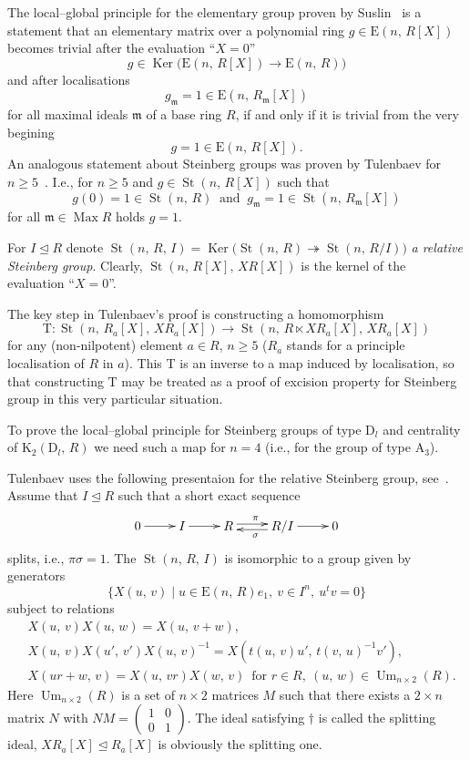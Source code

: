 \documentclass[11pt]{amsart}
\theoremstyle{plain} \declaretheorem[name=Theorem, Refname={Theorem,Theorems}]{tm} \Crefname{tm}{Theorem}{Theorems}
\numberwithin{equation}{section}
\theoremstyle{definition} \newtheorem{df}[lm]{Definition} \Crefname{df}{Definition}{Definitions}
\theoremstyle{remark} \newtheorem{rk}[lm]{Remark} \Crefname{rk}{Remark}{Remarks}
\newcommand{\Max}{\mathop{\mathrm{Max}}\nolimits}
\newcommand{\Ker}{\mathop{\mathrm{Ker}}\nolimits}
\newcommand{\E}{{\mathrm{E}}}
\newcommand{\Um}{\mathop{\mathrm{Um}}\nolimits}
\newcommand{\St}{\mathop{\mathrm{St}}\nolimits}
\newcommand{\epi}{\twoheadrightarrow}
\newcommand{\inv}{^{-1}}
\begin{document}
The local--global principle for the elementary group proven by Suslin~\cite{Sus} is a statement that an elementary matrix over a polynomial ring $g\in\E(n,\,R[X])$ becomes trivial after the evaluation ``$X=0$''
$$
g\in\Ker\big(\E(n,\,R[X])\rightarrow\E(n,\,R)\big)
$$
and after localisations
$$
g_{\mathfrak m}=1\in\E(n,\,R_{\mathfrak m}[X])
$$
for all maximal ideals $\mathfrak m$ of a base ring $R$, if and only if it is trivial from the very begining
$$
g=1\in\E(n,\,R[X]).
$$
An analogous statement about Steinberg groups was proven by Tulenbaev for $n\geq5$~\cite[Th.~2.1]{Tul}. I.e., for $n\geq5$ and $g\in\St(n,\,R[X])$ such that 
$$g(0)=1\in\St(n,\,R)\ \text{ and }\ g_{\mathfrak m}=1\in\St(n,\,R_{\mathfrak m}[X])$$
 for all $\mathfrak m\in\Max R$ holds $g=1$.

For $I\trianglelefteq R$ denote $\St(n,\,R,\,I)=\Ker\big(\St(n,\,R)\epi\St(n,\,R/I)\big)$ {\it a relative Steinberg group}. Clearly, $\St(n,\,R[X],\,XR[X])$ is the kernel of the evaluation ``$X=0$''.

The key step in Tulenbaev's proof is constructing a homomorphism
$$
\mathrm T\colon\St(n,\,R_a[X],\,XR_a[X])\rightarrow\St(n,\,R\ltimes XR_a[X],\,XR_a[X])
$$
for any (non-nilpotent) element $a\in R$, $n\geq5$ ($R_a$ stands for a principle localisation of $R$ in $a$). This $\mathrm T$ is an inverse to a map induced by localisation, so that constructing $\mathrm T$ may be treated as a proof of excision property for Steinberg group in this very particular situation.

To prove the local--global principle for Steinberg groups of type $\mathrm D_l$ and centrality of $\mathrm K_2(\mathrm D_l,\,R)$ we need such a map for $n=4$ (i.e., for the group of type $\mathrm A_3$).

Tulenbaev uses the following presentaion for the relative Steinberg group, see~\cite[Prop.~1.6]{Tul}. Assume that $I\trianglelefteq R$ such that a short exact sequence
\renewcommand{\theequation}{$\dagger$}
\begin{align}
\xymatrix{
0\ar@<0.1ex>[r]^{}&I\ar@<0.1ex>[r]^{}&R\ar@<0.5ex>[r]^{\pi}&R/I\ar@<0.5ex>[l]^{\sigma}\ar@<0.1ex>[r]^{}&0
}
\end{align}
splits, i.e., $\pi\sigma=1$. The $\St(n,\,R,\,I)$ is isomorphic to a group given by generators
$$
\{X(u,\,v)\mid u\in\E(n,\,R)e_1,\ v\in I^n,\ u^tv=0\}
$$
subject to relations
\setcounter{equation}{0}
\renewcommand{\theequation}{T\arabic{equation}}
\begin{align}
&X(u,\,v)X(u,\,w)=X(u,\,v+w),\\
&X(u,\,v)X(u',\,v')X(u,\,v)\inv=X(t(u,\,v)u',\,t(v,\,u)\inv v'),\\
&X(ur+w,\,v)=X(u,\,vr)X(w,\,v)\,\text{ for }r\in R,\ (u,\,w)\in\Um_{n\times2}(R).
\end{align}
Here $\Um_{n\times2}(R)$ is a set of $n\times2$ matrices $M$ such that there exists a $2\times n$ matrix $N$ with $NM=\begin{pmatrix}1&0\\0&1\end{pmatrix}$. The ideal satisfying $\dagger$ is called the splitting ideal, $XR_a[X]\trianglelefteq R_a[X]$ is obviously the splitting one.
\end{document}
